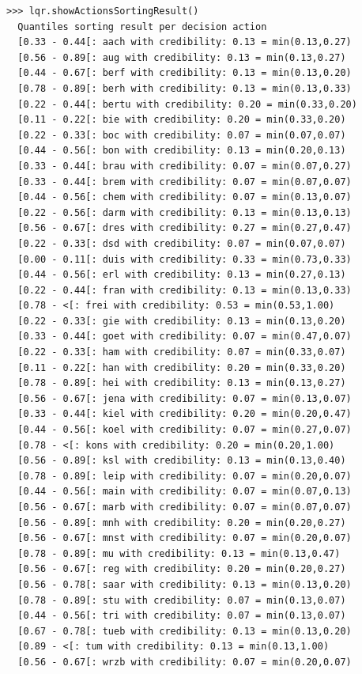 \begin{lstlisting}[caption={Enumerating chordless outranking circuits},label=list:14.6,basicstyle=\ttfamily\scriptsize]
>>> lqr.showActionsSortingResult()
  Quantiles sorting result per decision action
  [0.33 - 0.44[: aach with credibility: 0.13 = min(0.13,0.27)
  [0.56 - 0.89[: aug with credibility: 0.13 = min(0.13,0.27)
  [0.44 - 0.67[: berf with credibility: 0.13 = min(0.13,0.20)
  [0.78 - 0.89[: berh with credibility: 0.13 = min(0.13,0.33)
  [0.22 - 0.44[: bertu with credibility: 0.20 = min(0.33,0.20)
  [0.11 - 0.22[: bie with credibility: 0.20 = min(0.33,0.20)
  [0.22 - 0.33[: boc with credibility: 0.07 = min(0.07,0.07)
  [0.44 - 0.56[: bon with credibility: 0.13 = min(0.20,0.13)
  [0.33 - 0.44[: brau with credibility: 0.07 = min(0.07,0.27)
  [0.33 - 0.44[: brem with credibility: 0.07 = min(0.07,0.07)
  [0.44 - 0.56[: chem with credibility: 0.07 = min(0.13,0.07)
  [0.22 - 0.56[: darm with credibility: 0.13 = min(0.13,0.13)
  [0.56 - 0.67[: dres with credibility: 0.27 = min(0.27,0.47)
  [0.22 - 0.33[: dsd with credibility: 0.07 = min(0.07,0.07)
  [0.00 - 0.11[: duis with credibility: 0.33 = min(0.73,0.33)
  [0.44 - 0.56[: erl with credibility: 0.13 = min(0.27,0.13)
  [0.22 - 0.44[: fran with credibility: 0.13 = min(0.13,0.33)
  [0.78 - <[: frei with credibility: 0.53 = min(0.53,1.00)
  [0.22 - 0.33[: gie with credibility: 0.13 = min(0.13,0.20)
  [0.33 - 0.44[: goet with credibility: 0.07 = min(0.47,0.07)
  [0.22 - 0.33[: ham with credibility: 0.07 = min(0.33,0.07)
  [0.11 - 0.22[: han with credibility: 0.20 = min(0.33,0.20)
  [0.78 - 0.89[: hei with credibility: 0.13 = min(0.13,0.27)
  [0.56 - 0.67[: jena with credibility: 0.07 = min(0.13,0.07)
  [0.33 - 0.44[: kiel with credibility: 0.20 = min(0.20,0.47)
  [0.44 - 0.56[: koel with credibility: 0.07 = min(0.27,0.07)
  [0.78 - <[: kons with credibility: 0.20 = min(0.20,1.00)
  [0.56 - 0.89[: ksl with credibility: 0.13 = min(0.13,0.40)
  [0.78 - 0.89[: leip with credibility: 0.07 = min(0.20,0.07)
  [0.44 - 0.56[: main with credibility: 0.07 = min(0.07,0.13)
  [0.56 - 0.67[: marb with credibility: 0.07 = min(0.07,0.07)
  [0.56 - 0.89[: mnh with credibility: 0.20 = min(0.20,0.27)
  [0.56 - 0.67[: mnst with credibility: 0.07 = min(0.20,0.07)
  [0.78 - 0.89[: mu with credibility: 0.13 = min(0.13,0.47)
  [0.56 - 0.67[: reg with credibility: 0.20 = min(0.20,0.27)
  [0.56 - 0.78[: saar with credibility: 0.13 = min(0.13,0.20)
  [0.78 - 0.89[: stu with credibility: 0.07 = min(0.13,0.07)
  [0.44 - 0.56[: tri with credibility: 0.07 = min(0.13,0.07)
  [0.67 - 0.78[: tueb with credibility: 0.13 = min(0.13,0.20)
  [0.89 - <[: tum with credibility: 0.13 = min(0.13,1.00)
  [0.56 - 0.67[: wrzb with credibility: 0.07 = min(0.20,0.07)
\end{lstlisting}
